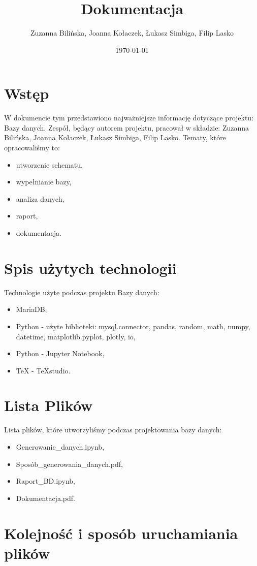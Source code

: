 \documentclass{article}
\title{Dokumentacja}
\author{Zuzanna Bilińska, Joanna Kołaczek, Łukasz Simbiga, Filip Lasko}
\date{\today}
\theoremstyle{break}
\begin{document}
	\maketitle
	\tableofcontents
	\clearpage
	
	
	\section{Wstęp}
	W dokumencie tym przedstawiono najważniejsze informację dotyczące projektu: Bazy danych. 
	Zespół, będący autorem projektu, pracował w składzie: Zuzanna Bilińska, Joanna Kołaczek, Łukasz Simbiga, Filip Lasko. Tematy, które opracowaliśmy to:
	\begin{itemize}
		\item utworzenie schematu,
		\item wypełnianie bazy,
		\item analiza danych,
		\item raport,
		\item dokumentacja.
	\end{itemize}
	
	\section{Spis użytych technologii}
	Technologie użyte podczas projektu Bazy danych:
	\begin{itemize}
		\item MariaDB,
		\item Python - użyte biblioteki: mysql.connector, pandas, random, math, numpy, datetime, matplotlib.pyplot, plotly, io,
		\item Python - Jupyter Notebook,
		\item TeX - TeXstudio.
	\end{itemize}
	\section{Lista Plików}
	Lista plików, które utworzyliśmy podczas projektowania bazy danych:
	\begin{itemize}
		\item Generowanie\_danych.ipynb,
		\item Sposób\_generowania\_danych.pdf,
		\item Raport\_BD.ipynb,
		\item Dokumentacja.pdf.
	\end{itemize}
	\section{Kolejność i sposób uruchamiania plików}
\end{document}
